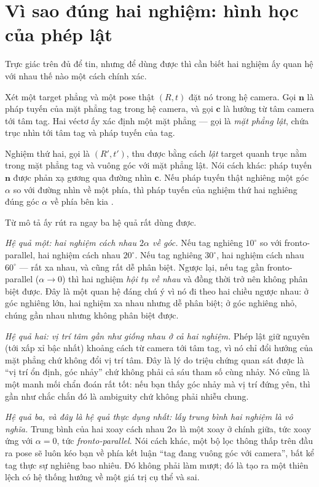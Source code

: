 \documentclass[../../marker.tex]{subfiles}
\begin{document}
\section{Vì sao đúng hai nghiệm: hình học của phép lật}

Trực giác trên đủ để tin, nhưng để dùng được thì cần biết hai nghiệm ấy quan hệ với nhau thế nào một cách chính xác.

Xét một target phẳng và một pose thật \((R, t)\) đặt nó trong hệ camera. Gọi \(\mathbf{n}\) là pháp tuyến của mặt phẳng tag trong hệ camera, và gọi \(\mathbf{c}\) là hướng từ tâm camera tới tâm tag. Hai véctơ ấy xác định một mặt phẳng --- gọi là \emph{mặt phẳng lật}, chứa trục nhìn tới tâm tag và pháp tuyến của tag.

Nghiệm thứ hai, gọi là \((R', t')\), thu được bằng cách \emph{lật} target quanh trục nằm trong mặt phẳng tag và vuông góc với mặt phẳng lật. Nói cách khác: pháp tuyến \(\mathbf{n}\) được phản xạ gương qua đường nhìn \(\mathbf{c}\). Nếu pháp tuyến thật nghiêng một góc \(\alpha\) so với đường nhìn về một phía, thì pháp tuyến của nghiệm thứ hai nghiêng đúng góc \(\alpha\) về phía bên kia \cite[§III]{schweighofer2006robust}.

Từ mô tả ấy rút ra ngay ba hệ quả rất dùng được.

\emph{Hệ quả một: hai nghiệm cách nhau \(2\alpha\) về góc.} Nếu tag nghiêng \(10^\circ\) so với fronto-parallel, hai nghiệm cách nhau \(20^\circ\). Nếu tag nghiêng \(30^\circ\), hai nghiệm cách nhau \(60^\circ\) --- rất xa nhau, và cũng rất dễ phân biệt. Ngược lại, nếu tag gần fronto-parallel (\(\alpha \to 0\)) thì hai nghiệm \emph{hội tụ về nhau} và đồng thời trở nên không phân biệt được. Đây là một quan hệ đáng chú ý vì nó đi theo hai chiều ngược nhau: ở góc nghiêng lớn, hai nghiệm xa nhau nhưng dễ phân biệt; ở góc nghiêng nhỏ, chúng gần nhau nhưng không phân biệt được.

\emph{Hệ quả hai: vị trí tâm gần như giống nhau ở cả hai nghiệm.} Phép lật giữ nguyên (tới xấp xỉ bậc nhất) khoảng cách từ camera tới tâm tag, vì nó chỉ đổi hướng của mặt phẳng chứ không đổi vị trí tâm. Đây là lý do triệu chứng quan sát được là ``vị trí ổn định, góc nhảy'' chứ không phải cả sáu tham số cùng nhảy. Nó cũng là một manh mối chẩn đoán rất tốt: nếu bạn thấy góc nhảy mà vị trí đứng yên, thì gần như chắc chắn đó là ambiguity chứ không phải nhiễu chung.

\emph{Hệ quả ba, và đây là hệ quả thực dụng nhất: lấy trung bình hai nghiệm là vô nghĩa.} Trung bình của hai xoay cách nhau \(2\alpha\) là một xoay ở chính giữa, tức xoay ứng với \(\alpha = 0\), tức \emph{fronto-parallel}. Nói cách khác, một bộ lọc thông thấp trên đầu ra pose sẽ luôn kéo bạn về phía kết luận ``tag đang vuông góc với camera'', bất kể tag thực sự nghiêng bao nhiêu. Đó không phải làm mượt; đó là tạo ra một thiên lệch có hệ thống hướng về một giá trị cụ thể và sai.
\end{document}
